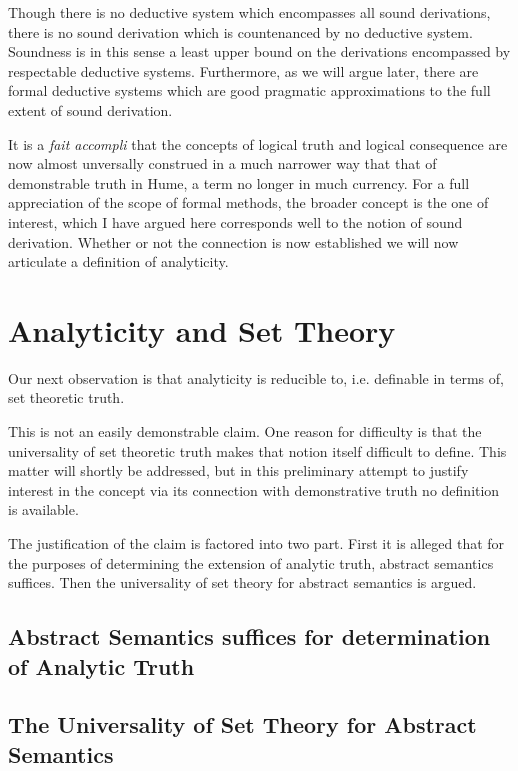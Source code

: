 \documentclass[numreferences]{rbjk}
\begin{document}
\begin{article}
{Though there is no deductive system which encompasses all sound derivations, there is no sound derivation which is countenanced by no deductive system.
Soundness is in this sense a least upper bound on the derivations encompassed by respectable deductive systems.
Furthermore, as we will argue later, there are formal deductive systems which are good pragmatic approximations to the full extent of sound derivation.

It is a {\it fait accompli} that the concepts of logical truth and logical consequence are now almost unversally construed in a much narrower way that that of demonstrable truth in Hume, a term no longer in much currency.
For a full appreciation of the scope of formal methods, the broader concept is the one of interest, which I have argued here corresponds well to the notion of sound derivation.
Whether or not the connection is now established we will now articulate a definition of analyticity.

}

\section{Analyticity and Set Theory}

Our next observation is that analyticity is reducible to, i.e. definable in terms of, set theoretic truth.

This is not an easily demonstrable claim.
One reason for difficulty is that the universality of set theoretic truth makes that notion itself difficult to define.
This matter will shortly be addressed, but in this preliminary attempt to justify interest in the concept via its connection with demonstrative truth no definition is available.

The justification of the claim is factored into two part.
First it is alleged that for the purposes of determining the extension of analytic truth, abstract semantics suffices.
Then the universality of set theory for abstract semantics is argued.

\subsection{Abstract Semantics suffices for determination of Analytic Truth}



\subsection{The Universality of Set Theory for Abstract Semantics}



\end{article}
\end{document}
